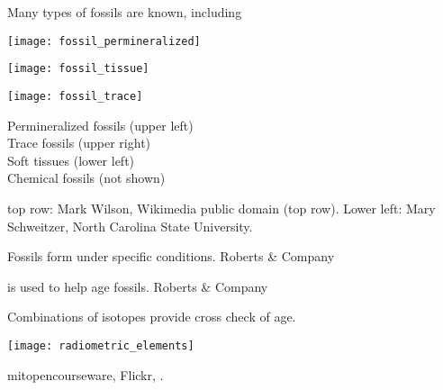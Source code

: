 \documentclass[t]{beamer}
\begin{document}
%
\begin{frame}[t]{Many types of fossils are known, including}

	\vspace*{-\baselineskip}

	\begin{multicols}{2}

		\texttt{[image: fossil\_permineralized]}\vspace*{\baselineskip}

		\texttt{[image: fossil\_tissue]}

	\columnbreak

		\texttt{[image: fossil\_trace]}\vspace*{\baselineskip}

		Permineralized fossils (upper left)\\
		Trace fossils (upper right)\\
		Soft tissues (lower left)\\
		Chemical fossils (not shown)

	\end{multicols}

	\vfilll

	\tiny top row: Mark Wilson, Wikimedia public domain (top row). Lower left: \textcopyright Mary Schweitzer, North Carolina State University.

\end{frame}
%
{
\begin{frame}[b]{Fossils form under specific conditions.}
\hfill \tiny \textcopyright Roberts \& Company
\end{frame}
}
%
{
\begin{frame}[b]{ is used to help age fossils.}
\hfill \tiny \textcopyright Roberts \& Company
\end{frame}
}
%
\begin{frame}[t]{Combinations of isotopes provide cross check of age.}

	\texttt{[image: radiometric\_elements]}

	\vfilll
	
	\hfill \tiny mitopencourseware, Flickr, .

\end{frame}
%
\end{document}
